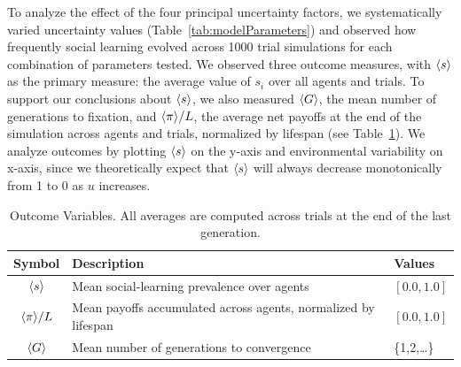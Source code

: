 \documentclass[letterpaper,11.5pt]{scrartcl}
\begin{document}
To analyze the effect of the four principal uncertainty factors, we systematically
varied uncertainty values (Table~\ref{tab:modelParameters}) and observed how frequently social learning evolved across 1000 trial simulations for each combination of parameters tested. %
We observed three outcome measures, with $\langle s \rangle$ as the primary measure: the average value of $s_i$ over all agents and trials. To support our conclusions about $\langle s \rangle$, we also measured $\langle G \rangle$, the mean number of generations to fixation, and $\langle \pi \rangle / L$, the average net  payoffs at the end of the simulation across agents and trials, normalized by lifespan (see Table~\ref{tab:outcomeVariables}). We analyze
outcomes by plotting $\langle s \rangle$ on the y-axis and environmental variability on
x-axis, since we theoretically expect that $\langle s \rangle$ will always decrease monotonically from 1 to 0 as $u$ increases. %

\begin{table}[h]
    \caption{Outcome Variables. All averages are computed across trials at the end of the last generation.}
    \label{tab:outcomeVariables}
    \centering %
    \begin{tabular}{cp{4.25in}p{0.85in}} \toprule

        Symbol & Description & Values \\ 

        \midrule  

        $\langle s \rangle$ & Mean social-learning prevalence over agents
                  & $ [0.0, 1.0]$ \\

        $\langle \pi \rangle / L$ & Mean payoffs accumulated across agents, normalized by
        lifespan & $ [0.0, 1.0]$ \\

        $\langle G \rangle$ & Mean number of generations to convergence & \{1,2,\ldots\} \\
        \bottomrule
    \end{tabular}
\end{table}
\end{document}
